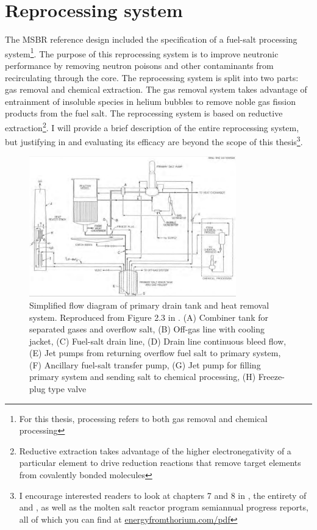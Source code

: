 \section{Reprocessing system}
\label{sec:msbr-reprocessing-system}
The MSBR reference design included the specification of a fuel-salt processing
system\footnote{For this thesis, processing refers to both gas removal and
chemical processing}. The purpose of this reprocessing system is to improve
neutronic performance by removing neutron poisons and other contaminants from
recirculating through the core. The reprocessing system is split into two parts:
gas removal and chemical extraction. The gas removal system takes advantage
of entrainment of insoluble species in helium bubbles to remove noble gas
fission products from the fuel salt. The reprocessing system is based on
reductive extraction\footnote{Reductive extraction takes advantage of the higher
electronegativity of a particular element to drive reduction reactions that
remove target elements from covalently bonded molecules}. I will provide a brief
description of the entire reprocessing system, but justifying in and evaluating
its efficacy are beyond the scope of this thesis\footnote{I encourage interested
readers to look at chapters 7 and 8 in \cite{robertson_conceptual_1971}, the
entirety of \cite{carter_design_1972} and \cite{lindauer_design_1969}, as well
as the molten salt reactor program semiannual progress reports, all of which you
can find at \url{energyfromthorium.com/pdf}}.

\begin{figure}[htpb]
    \centering
    \includegraphics[width=0.8\textwidth]{figs/ch4/msbr_primary_system.png}
    \caption{Simplified flow diagram of primary drain tank and heat removal
    system. Reproduced from Figure 2.3 in \cite{robertson_conceptual_1971}. (A)
    Combiner tank for separated gases and overflow salt, (B) Off-gas line with
    cooling jacket, (C) Fuel-salt drain line, (D) Drain line continuous bleed
    flow, (E) Jet pumps from returning overflow fuel salt to primary system, (F)
    Ancillary fuel-salt transfer pump, (G) Jet pump for filling primary system
    and sending salt to chemical processing, (H) Freeze-plug type valve }
    \label{fig:msbr_primary_system}
\end{figure}

